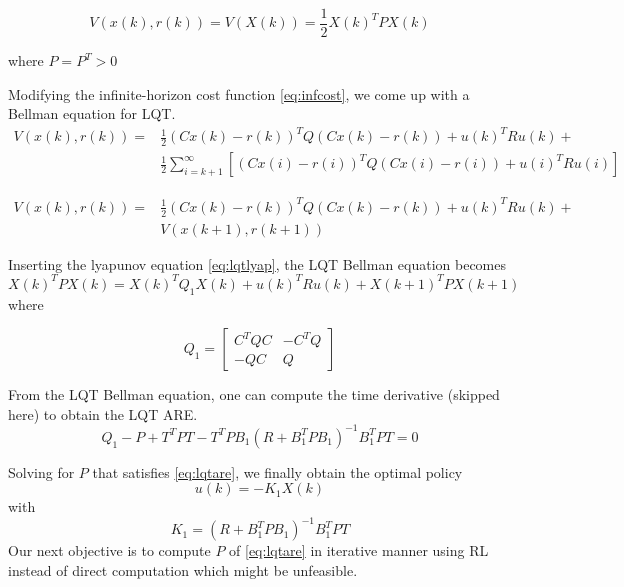 \begin{equation}
\label{eq:lqtlyap}
V(x(k), r(k)) = V(X(k)) = \frac{1}{2}X(k)^TPX(k)
\end{equation}

where $ P = P^T > 0 $

Modifying the infinite-horizon cost function \eqref{eq:infcost}, we come up with a Bellman equation for \acs{LQT}.
\begin{equation}
\begin{split}
V(x(k), r(k)) = &\frac{1}{2} (Cx(k)-r(k))^TQ(Cx(k)-r(k)) + u(k)^TRu(k) + \\
&\frac{1}{2} \sum_{i=k+1}^{\infty} \left[ (Cx(i)-r(i))^TQ(Cx(i)-r(i)) + u(i)^TRu(i)\right] 
\end{split}
\end{equation}

\begin{equation}
\begin{split}
V(x(k), r(k)) = &\frac{1}{2} (Cx(k)-r(k))^TQ(Cx(k)-r(k)) + u(k)^TRu(k) + \\
& V(x(k+1), r(k+1))
\end{split}
\end{equation}

Inserting the lyapunov equation \eqref{eq:lqtlyap}, the \acs {LQT} Bellman equation becomes
\begin{equation}
\label{eq:lqtbellman}
X(k)^TPX(k) =  X(k)^TQ_1X(k) + u(k)^TRu(k) + X(k+1)^TPX(k+1)
\end{equation}
where

\begin{equation}
Q_1 = \left[ \begin{array}{cc}
C^TQC & -C^TQ \\ 
-QC & Q
\end{array} \right] 
\end{equation}

From the \acs {LQT} Bellman equation, one can compute the time derivative (skipped here) to obtain the \acs {LQT} ARE.
\begin{equation}
\label{eq:lqtare}
Q_1 - P + T^TPT - T^TPB_1(R+B_1^TPB_1)^{-1}B_1^TPT = 0
\end{equation}

Solving for $P$ that satisfies \eqref{eq:lqtare}, we finally obtain the optimal policy 
\begin{equation}
\label{eq:opt_u}
u(k) = -K_1X(k)
\end{equation}
with
\begin{equation}
K_1 = (R+B_1^TPB_1)^{-1}B_1^TPT
\end{equation}
Our next objective is to compute $P$ of \eqref{eq:lqtare} in iterative manner using \acs {RL} instead of direct computation which might be unfeasible. 

